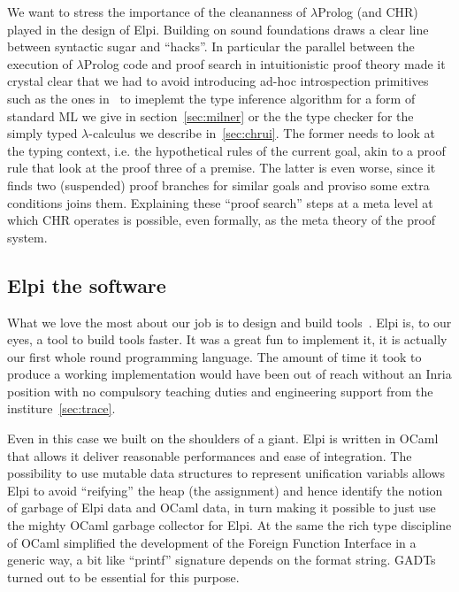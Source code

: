 \documentclass[a4paper, 11pt]{book}
\begin{document}
We want to stress the importance of the cleananness of $\lambda$Prolog (and CHR)
played in the design of Elpi. Building on sound foundations draws a clear
line between syntactic sugar and ``hacks''. In particular the parallel between the
execution of $\lambda$Prolog code and proof search in intuitionistic
proof theory made it crystal clear that we had to avoid introducing ad-hoc
introspection primitives such as the ones in~\cite[Section 8 and later]{10.1145/3236788}
to imeplemt the type inference algorithm for a form of standard ML we give in
section~\ref{sec:milner} or the the type checker for the simply
typed $\lambda$-calculus we describe in~\ref{sec:chrui}.
The former needs to look at the typing context, i.e. the hypothetical rules
of the current goal, akin to a proof rule that look at the proof three of a premise.
The latter is even worse, since it finds two (suspended) proof branches for
similar goals and proviso some extra conditions joins them. Explaining
these ``proof search'' steps at a meta level at which CHR operates is possible,
even formally, as the meta theory of the proof system.


\subsection{Elpi the software}

What we love the most about our job is to design and build tools~\cite{matita,ssr,rocq}.
Elpi is, to our eyes, a tool to build tools faster. It was a great fun to
implement it, it is actually our first whole round programming language.
The amount of time it took to produce a working implementation
would have been out of reach without an Inria position with no compulsory
teaching duties and engineering support from the institure~\ref{sec:trace}.

Even in this case we built on the shoulders of a giant. Elpi is written in
OCaml that allows it deliver reasonable performances and ease of integration.
The possibility to use mutable data structures to represent unification
variabls allows Elpi to avoid ``reifying'' the heap (the assignment) and
hence identify the notion of garbage of Elpi data and OCaml data, in turn
making it possible to just use the mighty OCaml garbage collector for Elpi.
At the same the rich type discipline of OCaml simplified the development of the
Foreign Function Interface in a generic way, a bit like ``printf'' signature
depends on the format string. GADTs turned out to be essential for this purpose.
\end{document}
